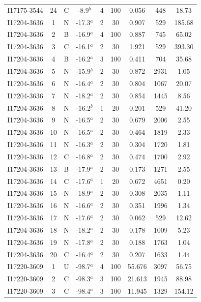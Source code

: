 \begin{table}
\begin{tabular}{ccccccccc}
I17175-3544 & 24 & C & -8.9$^{b}$ & 4 & 100 & 0.056 & 448 & 18.73 \\
I17204-3636 & 1 & N & -17.3$^{a}$ & 2 & 30 & 0.907 & 529 & 185.68 \\
I17204-3636 & 2 & B & -16.9$^{a}$ & 4 & 100 & 0.887 & 745 & 65.02 \\
I17204-3636 & 3 & C & -16.1$^{a}$ & 2 & 30 & 1.921 & 529 & 393.30 \\
I17204-3636 & 4 & B & -16.2$^{a}$ & 3 & 100 & 0.411 & 704 & 35.68 \\
I17204-3636 & 5 & N & -15.9$^{b}$ & 2 & 30 & 0.872 & 2931 & 1.05 \\
I17204-3636 & 6 & N & -16.4$^{a}$ & 2 & 30 & 0.804 & 1067 & 20.07 \\
I17204-3636 & 7 & N & -18.2$^{a}$ & 2 & 30 & 0.854 & 1445 & 8.56 \\
I17204-3636 & 8 & N & -16.2$^{b}$ & 1 & 20 & 0.201 & 529 & 41.20 \\
I17204-3636 & 9 & N & -16.5$^{a}$ & 2 & 30 & 0.679 & 2006 & 2.55 \\
I17204-3636 & 10 & N & -16.5$^{a}$ & 2 & 30 & 0.464 & 1819 & 2.33 \\
I17204-3636 & 11 & N & -16.3$^{a}$ & 2 & 30 & 0.304 & 1720 & 1.81 \\
I17204-3636 & 12 & C & -16.8$^{a}$ & 2 & 30 & 0.474 & 1700 & 2.92 \\
I17204-3636 & 13 & B & -17.9$^{a}$ & 2 & 30 & 0.173 & 1271 & 2.55 \\
I17204-3636 & 14 & C & -17.6$^{a}$ & 1 & 20 & 0.672 & 4651 & 0.20 \\
I17204-3636 & 15 & N & -18.9$^{a}$ & 2 & 30 & 0.308 & 2035 & 1.11 \\
I17204-3636 & 16 & N & -16.6$^{a}$ & 2 & 30 & 0.351 & 1996 & 1.34 \\
I17204-3636 & 17 & N & -17.6$^{a}$ & 2 & 30 & 0.062 & 529 & 12.62 \\
I17204-3636 & 18 & N & -18.2$^{a}$ & 2 & 30 & 0.178 & 1009 & 5.23 \\
I17204-3636 & 19 & N & -17.8$^{a}$ & 2 & 30 & 0.188 & 1763 & 1.04 \\
I17204-3636 & 20 & C & -16.4$^{a}$ & 2 & 30 & 0.207 & 1633 & 1.44 \\
I17220-3609 & 1 & U & -98.7$^{a}$ & 4 & 100 & 55.676 & 3097 & 56.75 \\
I17220-3609 & 2 & C & -98.3$^{a}$ & 3 & 100 & 21.613 & 1945 & 88.98 \\
I17220-3609 & 3 & C & -98.4$^{a}$ & 3 & 100 & 11.945 & 1329 & 154.12 \\

\end{tabular}
\end{table}
